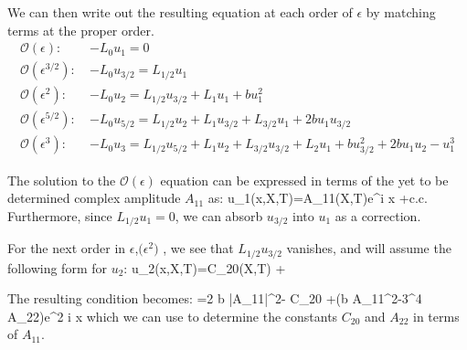 \documentclass[../main/FlatMarginalStability.tex]{subfiles}
\begin{document}
We can then write out the resulting equation at each order of $\epsilon$ by matching terms at the proper order.
\begin{subequations}
\begin{align}
\mathcal{O}(\epsilon): \:  &-L_0 u_1 =0
\label{eq:msh23o1b} \\
\mathcal{O}(\epsilon^{3/2}): \: &-L_0 u_{3/2} = L_{1/2} u_1 
\label{eq:msh23o15b} \\
\mathcal{O}(\epsilon^2): \:  &-L_0 u_2 = L_{1/2} u_{3/2} +L_1 u_1 +b u_1^2
\label{eq:msh23o2b}\\
\mathcal{O}(\epsilon^{5/2}): \:  &-L_0 u_{5/2} = L_{1/2} u_{2} +L_1 u_{3/2}+ L_{3/2} u_1 +2b u_1 u_{3/2}
\label{eq:msh23o25b}\\
\mathcal{O}(\epsilon^{3}): \:  &-L_0 u_{3} = L_{1/2} u_{5/2} +L_1 u_{2}+ L_{3/2} u_{3/2}+L_2 u_1   +b u_{3/2}^2+2b u_1 u_2 -u_1^3
\label{eq:msh23o25b}
\end{align}
\end{subequations}

The solution to the $\mathcal{O}(\epsilon)$ equation can be expressed in terms of the yet to be determined complex amplitude $A_{11}$ as:
\beqn
u_1(x,X,T)=A_{11}(X,T)e^{i x} +c.c.
\label{eq:sol23o1}
\eeqn
Furthermore, since $L_{1/2} u_1=0$, we can absorb $u_{3/2}$ into $u_1$ as a correction. 

For the next order in $\epsilon$,$\mathcal(\epsilon^2)$ , we see that $L_{1/2} u_{3/2}$ vanishes, and will assume the following form for $u_2$:
\beqn
u_2(x,X,T)=C_{20}(X,T)  + \left[ A_{21}(X,T)e^{i x}+A_{22}(X,T)e^{2 i x}  +c.c.\right]\nonumber
\label{eq:sol23o2}
\eeqn

The resulting condition becomes:
=2 b |A_{11}|^2- C_{20} +\left(b A_{11}^2-3^4 A_{22}\right)e^{2 i x}  
\label{eq:solvability2}
\eeqn
which we can use to determine the constants $C_{20}$ and $A_{22}$ in terms of $A_{11}$.  
\end{document}
